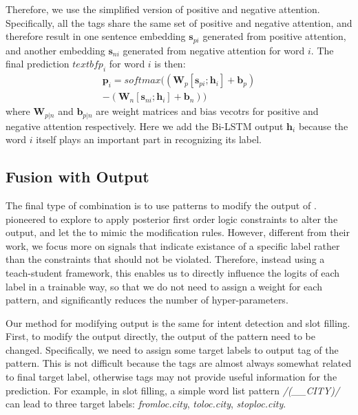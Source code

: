 Therefore, we use the simplified version of positive and negative attention. Specifically, all the tags share the same set of positive and negative attention, and therefore result in one sentence embedding $\textbf{s}_{pi}$ generated from positive attention, and another embedding $\textbf{s}_{ni}$ generated from negative attention for word $i$. The final prediction $textbf{p}_i$ for word $i$ is then:
\begin{equation}
\begin{split}
\textbf{p}_i = softmax((\textbf{W}_p [\textbf{s}_{pi}; \textbf{h}_i] + \textbf{b}_p) \\- (\textbf{W}_n [\textbf{s}_{ni}; \textbf{h}_i] + \textbf{b}_n))
\end{split} 
\end{equation} 
where $\textbf{W}_{p|n}$ and $\textbf{b}_{p|n}$ are weight matrices and bias vecotrs for positive and negative attention respectively. Here we add the Bi-LSTM output $\textbf{h}_i$ because the word $i$ itself plays an important part in recognizing its label.

\subsection{Fusion with Output}
\label{fusion_with_output}
The final type of combination is to use \RE patterns to modify the output of \NN. \cite{hu2016harnessing} pioneered to explore to apply posterior first order logic constraints to alter the \NN output, and let the \NN to mimic the modification rules. However, different from their work, we focus more on signals that indicate existance of a specific label rather than the constraints that should not be violated. Therefore, instead using a teach-student framework, this enables us to directly influence the logits of each label in a trainable way, so that we do not need to assign a weight for each pattern, and significantly reduces the number of hyper-parameters.

Our method for modifying output is the same for intent detection and slot filling.
First, to modify the output directly, the output of the \RE pattern need to be changed. Specifically, we need to assign some target labels to output tag of the \RE pattern. This is not difficult because the \RE tags are almost always somewhat related to final target label, otherwise \RE tags may not provide useful information for the prediction. For example, in slot filling, a simple word list pattern \textsl{/(\_\_CITY)/} can lead to three target labels: \emph{fromloc.city}, \emph{toloc.city}, \emph{stoploc.city}.

